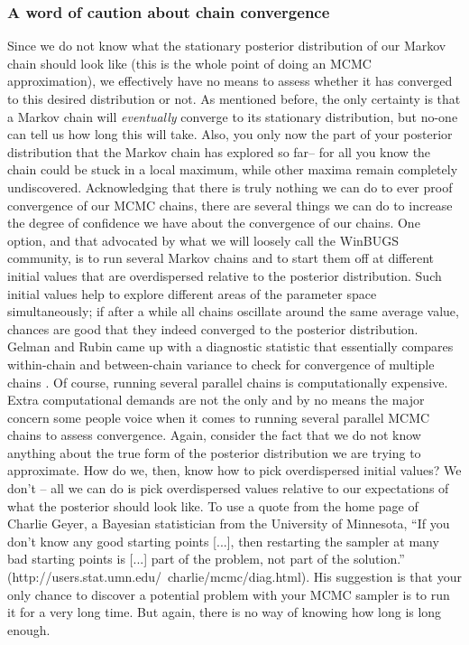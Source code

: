 \subsubsection{A word of caution about chain convergence }
Since we do not know what the stationary posterior distribution of our Markov chain should look like (this is the whole point of doing an MCMC approximation), we effectively have no means to assess whether it has converged to this desired distribution or not. As mentioned before, the only certainty is that a Markov chain will {\it eventually} converge to its stationary distribution, but no-one can tell us how long this will take. Also, you only now the part of your posterior distribution that the Markov chain has explored so far– for all you know the chain could be stuck in a local maximum, while other maxima remain completely undiscovered.  Acknowledging that there is truly nothing we can do to ever proof convergence of our MCMC chains, there are several things we can do to increase the degree of confidence we have about the convergence of our chains. One option, and that advocated by what we will loosely call the WinBUGS community, is to run several Markov chains and to start them off at different initial values that are overdispersed relative to the posterior distribution. Such initial values help to explore different areas of the parameter space simultaneously; if after a while all chains oscillate around the same average value, chances are good that they indeed converged to the posterior distribution. Gelman and Rubin came up with a diagnostic statistic that essentially compares within-chain and between-chain variance to check for convergence of multiple chains \citep{gelman_etal:2004}. Of course, running several parallel chains is computationally expensive.
Extra computational demands are not the only and by no means the major concern some people voice when it comes to running several parallel MCMC chains to assess convergence. Again, consider the fact that we do not know anything about the true form of the posterior distribution we are trying to approximate. How do we, then, know how to pick overdispersed initial values? We don’t – all we can do is pick overdispersed values relative to our expectations of what the posterior should look like. To use a quote from the home page of Charlie Geyer, a Bayesian statistician from the University of Minnesota, ``If you don't know any good starting points [...], then restarting the sampler at many bad starting points is [...] part of the problem, not part of the solution.'' (http://users.stat.umn.edu/~charlie/mcmc/diag.html). His suggestion is that your only chance to discover a potential problem with your MCMC sampler is to run it for a very long time. But again, there is no way of knowing how long is long enough.
